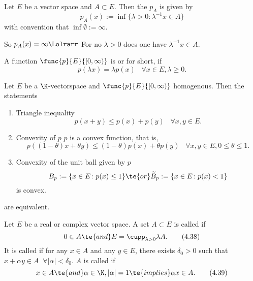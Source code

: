 \begin{definition}\label{iv.15}
    Let $E$ be a vector space and $A\subset E$. Then the  $p_A$ is given by
    \[p_A(x):=\inf\{\lambda>0\colon\lambda^{-1}x\in A\}\tag{4.34}\label{4.34}\]
    with convention that $\inf\emptyset:=\infty$. 
    
    So $p_A(x)=\infty\Lolrarr$ For no $\lambda>0$ does one have $\lambda^{-1}x\in A$.
\end{definition}

\begin{definition}\label{iv.16}
    A function $\func{p}{E}{[0,\infty)}$ is  \rec{(}or for short, \rec{)} if
    \[p(\lambda x)=\lambda p(x)\;\;\;\forall x\in E,\lambda\geq0.\]
\end{definition}

\begin{prop}\label{iv.17}
    Let $E$ be a $\K$-vectorspace and $\func{p}{E}{[0,\infty)}$ homogenous. Then the statements
    \begin{enumerate}[label=\alph*)]
        \item \rec{(}Triangle inequality\rec{)}\label{iv.17.a}
        \[p(x+y)\leq p(x)+p(y)\;\;\;\forall x,y\in E.\tag{4.35}\label{4.35}\]
        
        \item \rec{(}Convexity of $p$\rec{)} $p$ is a convex function, that is,\label{iv.17.b}
        \[p((1-\theta)x+\theta y)\leq(1-\theta)p(x)+\theta p(y)\;\;\;\forall x,y\in E,0\leq\theta\leq1.\tag{4.36}\label{4.36}\]
        
        \item \rec{(}Convexity of the unit ball \rec{(}given by $p$\rec{)}\rec{)}\label{iv.17.c}
        \[B_p:=\{x\in E\colon p(x)\leq1\}\te{ or }\widetilde{B}_p:=\{x\in E\colon p(x)<1\}\]
        is convex. 
    \end{enumerate}
    are equivalent.
\end{prop}

\begin{definition}\label{iv.18}
    Let $E$ be a real or complex vector space. A set $A\subset E$ is called  if
    \[0\in A\te{ and }E=\cupp_{\lambda>0}\lambda A.\tag{4.38}\label{4.38}\]
    It is called  if for any $x\in A$ and any $y\in E$, there exists $\delta_0>0$ such that $x+\alpha y\in A\;\;\forall|\alpha|<\delta_0$. $A$ is called  if
    \[x\in A\te{ and }\alpha\in\K,|\alpha|=1\te{ implies }\alpha x\in A.\tag{4.39}\label{4.39}\]
\end{definition}

